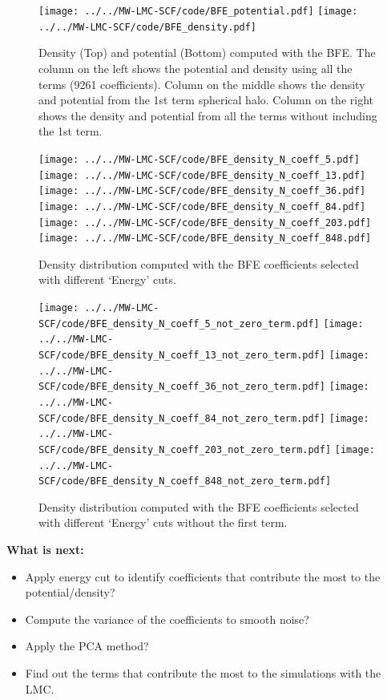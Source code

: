 \documentclass[14pt]{article}
\begin{document}
\begin{figure}[H]
  \centering
  \texttt{[image: ../../MW-LMC-SCF/code/BFE\_potential.pdf]}
  \texttt{[image: ../../MW-LMC-SCF/code/BFE\_density.pdf]}
  \caption{Density (Top) and potential (Bottom) computed with the BFE. The
  column on the left shows the potential and density using all the terms (9261
  coefficients). Column on the middle shows the density and potential from the
  1st term spherical halo. Column on the right shows the density and potential
  from all the terms without including the 1st term.}

\end{figure}




\begin{figure}[H]
  \centering
  \texttt{[image: ../../MW-LMC-SCF/code/BFE\_density\_N\_coeff\_5.pdf]}
  \texttt{[image: ../../MW-LMC-SCF/code/BFE\_density\_N\_coeff\_13.pdf]}
  \texttt{[image: ../../MW-LMC-SCF/code/BFE\_density\_N\_coeff\_36.pdf]}
  \texttt{[image: ../../MW-LMC-SCF/code/BFE\_density\_N\_coeff\_84.pdf]}
  \texttt{[image: ../../MW-LMC-SCF/code/BFE\_density\_N\_coeff\_203.pdf]}
  \texttt{[image: ../../MW-LMC-SCF/code/BFE\_density\_N\_coeff\_848.pdf]}
  \caption{Density distribution computed with the BFE coefficients selected with
  different `Energy' cuts.}
\end{figure}




\begin{figure}[H]
  \centering
  \texttt{[image: ../../MW-LMC-SCF/code/BFE\_density\_N\_coeff\_5\_not\_zero\_term.pdf]}
  \texttt{[image: ../../MW-LMC-SCF/code/BFE\_density\_N\_coeff\_13\_not\_zero\_term.pdf]}
  \texttt{[image: ../../MW-LMC-SCF/code/BFE\_density\_N\_coeff\_36\_not\_zero\_term.pdf]}
  \texttt{[image: ../../MW-LMC-SCF/code/BFE\_density\_N\_coeff\_84\_not\_zero\_term.pdf]}
  \texttt{[image: ../../MW-LMC-SCF/code/BFE\_density\_N\_coeff\_203\_not\_zero\_term.pdf]}
  \texttt{[image: ../../MW-LMC-SCF/code/BFE\_density\_N\_coeff\_848\_not\_zero\_term.pdf]}
  \caption{Density distribution computed with the BFE coefficients selected with
  different `Energy' cuts without the first term.}
\end{figure}





\textbf{What is next:}\\
\begin{itemize}
\item Apply energy cut to identify coefficients that contribute the most to the potential/density?
\item Compute the variance of the coefficients to smooth noise?
\item Apply the PCA method? 
\item Find out the terms that contribute the most to the simulations with the LMC.
\end{itemize}
\end{document}
